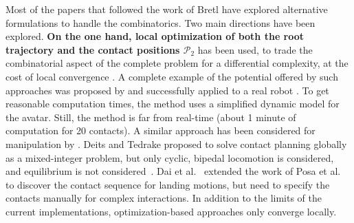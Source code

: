 \documentclass[journal]{IEEEtran}
\providecommand{\DIFaddtex}[1]{#1} %
\providecommand{\DIFaddbegin}{\protect\color{blue}} %
\providecommand{\DIFaddend}{\protect\color{black}} %
\providecommand{\DIFadd}[1]{\texorpdfstring{\DIFaddtex{#1}}{#1}} %
\begin{document}
Most of the papers that followed the work of Bretl have explored alternative formulations to handle the combinatorics. Two main directions have been explored. \textbf{On the one hand, local optimization of both the root trajectory \Pa and the contact positions $\mathcal{P}_2$} has been used, to trade the combinatorial \DIFaddbegin \DIFadd{aspect }\DIFaddend of the complete problem for a differential complexity, at the cost of local convergence \citep{1631739}. A complete example of the potential offered by such approaches was proposed by \cite{Mordatch:2012:DCB:2185520.2185539} and successfully applied to a real robot \citep{mordatch2015}. To get reasonable computation times, the method uses a simplified dynamic model for the avatar. Still, the method is far from real-time  (about 1 minute of computation for 20 contacts).  A similar approach has been considered for manipulation by \cite{gabicciniisrr15}. Deits and Tedrake proposed to solve contact planning globally as a mixed-integer problem, but only cyclic, bipedal locomotion is considered, and equilibrium is not considered~\cite{DBLP:conf/humanoids/DeitsT14}. 
Dai et al.~\cite{dai2014whole} extended the work of Posa et al.~\cite{Posa:2014:DMT:2568343.2568352} to discover the contact sequence for landing motions, but need to specify
the contacts manually for complex interactions.
In addition to the limits of the current implementations, optimization-based approaches only converge locally.
\end{document}
